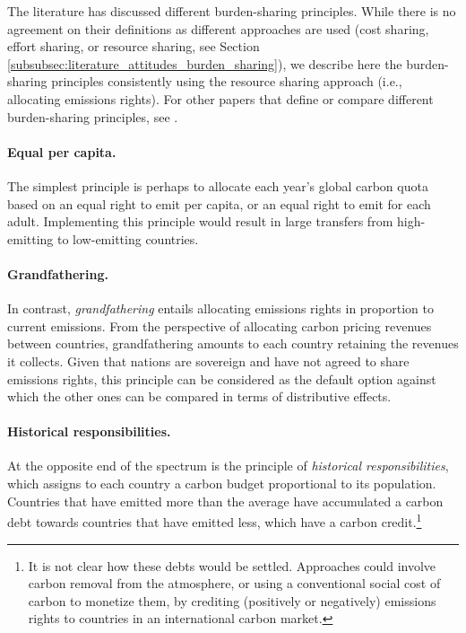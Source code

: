 \documentclass[12pt,english]{article}
\begin{document}
The literature has discussed different burden-sharing principles. While there is no  agreement on their definitions as different approaches are used (cost sharing, effort sharing, or resource sharing, see Section \ref{subsubsec:literature_attitudes_burden_sharing}), we describe here the burden-sharing principles consistently using the resource sharing approach (i.e., allocating emissions rights). For other papers that define or compare different burden-sharing principles, see \citet{leimbach_burden_2019,zhou_carbon_2016,vaillancourt_equity_2004}.

\paragraph{Equal per capita.} The simplest principle is perhaps to allocate each year's global carbon quota based on an equal right to emit per capita, or an equal right to emit for each adult. Implementing this principle would result in large transfers from high-emitting to low-emitting countries. 

\paragraph{Grandfathering.} In contrast, \textit{grandfathering} entails allocating emissions rights in proportion to current emissions. From the perspective of allocating carbon pricing revenues between countries, grandfathering amounts to each country retaining the revenues it collects. Given that nations are sovereign and have not agreed to share emissions rights, this principle can be considered as the default option against which the other ones can be compared in terms of distributive effects.

\paragraph{Historical responsibilities.} At the opposite end of the spectrum is the principle of \textit{historical responsibilities}, which assigns to each country a carbon budget proportional to its population. Countries that have emitted more than the average have accumulated a carbon debt towards countries that have emitted less, which have a carbon credit.\footnote{It is not clear how these debts would be settled. Approaches could involve carbon removal from the atmosphere, or using a conventional social cost of carbon to monetize them, by crediting (positively or negatively) emissions rights to countries in an international carbon market.} 
\end{document}
